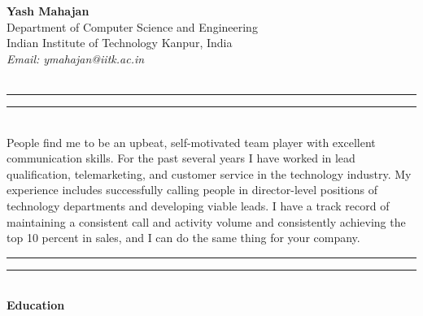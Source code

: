\documentclass[a4paper, 11pt]{article}
\begin{document}
\raggedright
\textbf{Yash Mahajan}\\
Department of Computer Science and Engineering\\
Indian Institute of Technology Kanpur, India\\
\textit{Email: ymahajan@iitk.ac.in}\\~\\
\hrule
\vspace{0.33em}
\hrule
~\\
People find me to be an upbeat, self-motivated team player with excellent communication skills. For the past several years I have worked in lead qualification, telemarketing, and customer service in the technology industry. My experience includes successfully calling people in director-level positions of technology departments and developing viable leads. I have a track record of maintaining a consistent call and activity volume and consistently achieving the top 10 percent in sales, and I can do the same thing for your company.
\vspace{0.33em}
~\\
\hrule
\vspace{0.33em}
\hrule
~\\
\textbf{Education}\\~\\
\end{document}

